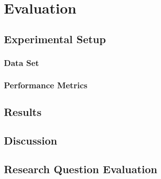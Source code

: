 \chapter{Evaluation}
\label{ch:evaluation}

\section{Experimental Setup}

\subsection{Data Set}
\label{sec:dataset}

\subsection{Performance Metrics}

\section{Results}
\label{sec:results}

\section{Discussion}

\section{Research Question Evaluation}
